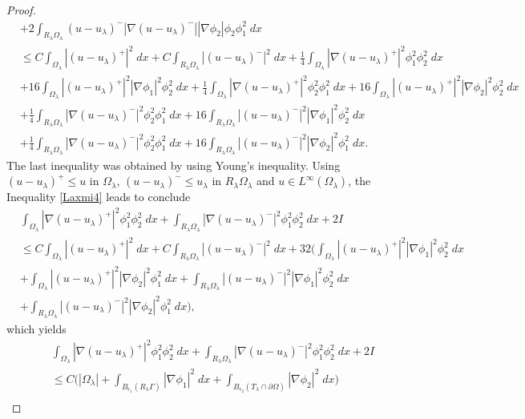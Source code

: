 \documentclass[11pt, notitlepage]{article}
\begin{document}
{\begin{proof}
\begin{align}
  &+2\int_{R_\lambda\Omega_\lambda}(u-u_\lambda)^-|\nabla(u-u_\lambda)^-||\nabla\phi_2|\phi_2\phi_1^2\;dx\nonumber\\
 &\leq C\int_{\Omega_\lambda} |(u-u_\lambda)^+|^2\;dx+C\int_{R_\lambda\Omega_\lambda} |(u-u_\lambda)^-|^2\;dx+\frac{1}{4}\int_{\Omega_\lambda}|\nabla(u-u_\lambda)^+|^2\phi_1^2\phi_2^2\;dx\nonumber\\
  &+16\int_{\Omega_\lambda}|(u-u_\lambda)^+|^2|\nabla\phi_1|^2\phi_2^2\;dx+\frac{1}{4}\int_{\Omega_\lambda}|\nabla(u-u_\lambda)^+|^2\phi_2^2\phi_1^2\;dx+16\int_{\Omega_\lambda}|(u-u_\lambda)^+|^2|\nabla\phi_2|^2\phi_2^2\;dx\nonumber\\
  &+\frac{1}{4}\int_{R_\lambda\Omega_\lambda}|\nabla(u-u_\lambda)^-|^2\phi_2^2\phi_1^2\;dx+16\int_{R_\lambda\Omega_\lambda}|(u-u_\lambda)^-|^2|\nabla\phi_1|^2\phi_2^2\;dx\nonumber\\ 
  &+\frac{1}{4}\int_{R_\lambda\Omega_\lambda}|\nabla(u-u_\lambda)^-|^2\phi_2^2\phi_1^2\;dx+16\int_{R_\lambda\Omega_\lambda}|(u-u_\lambda)^-|^2|\nabla\phi_2|^2\phi_1^2\;dx.
\end{align}
The last inequality was obtained by using Young's inequality. Using $(u-u_\lambda)^+\leq u$ in $\Omega_\lambda$, $(u-u_\lambda)^-\leq u_\lambda$ in $R_\lambda\Omega_\lambda$ and $u\in L^\infty(\Omega_\lambda)$, the Inequality \eqref{Laxmi4} leads to conclude
\begin{align}\label{ImpI}
    &\int_{\Omega_\lambda}|\nabla(u-u_\lambda)^+|^2\phi_1^2\phi_2^2\;dx+\int_{R_\lambda\Omega_\lambda}|\nabla(u-u_\lambda)^-|^2\phi_1^2\phi_2^2\;dx+2I\nonumber\\
    &\leq C\int_{\Omega_\lambda} |(u-u_\lambda)^+|^2\;dx+C\int_{R_\lambda\Omega_\lambda} |(u-u_\lambda)^-|^2\;dx+32\big(\int_{\Omega_\lambda}|(u-u_\lambda)^+|^2|\nabla\phi_1|^2\phi_2^2\;dx\nonumber\\
    &+\int_{\Omega_\lambda}|(u-u_\lambda)^+|^2|\nabla\phi_2|^2\phi_1^2\;dx+\int_{R_\lambda\Omega_\lambda}|(u-u_\lambda)^-|^2|\nabla\phi_1|^2\phi_2^2\;dx\nonumber\\
    &+\int_{R_\lambda\Omega_\lambda}|(u-u_\lambda)^-|^2|\nabla\phi_2|^2\phi_1^2\;dx\big),
\end{align}
    which yields
    \begin{align}\label{Ranjit2}
    &\int_{\Omega_\lambda}|\nabla(u-u_\lambda)^+|^2\phi_1^2\phi_2^2\;dx+\int_{R_\lambda\Omega_\lambda}|\nabla(u-u_\lambda)^-|^2\phi_1^2\phi_2^2\;dx+2I\nonumber\\
    &\leq C\Big(|\Omega_\lambda|+\int_{B_{\epsilon_1}(R_\lambda\Gamma)}|\nabla\phi_1|^2\;dx+\int_{B_{\epsilon_2}(T_\lambda\cap\partial\Omega)}|\nabla\phi_2|^2\;dx\Big)\nonumber\\

\end{align}
\end{proof}}
\end{document}
